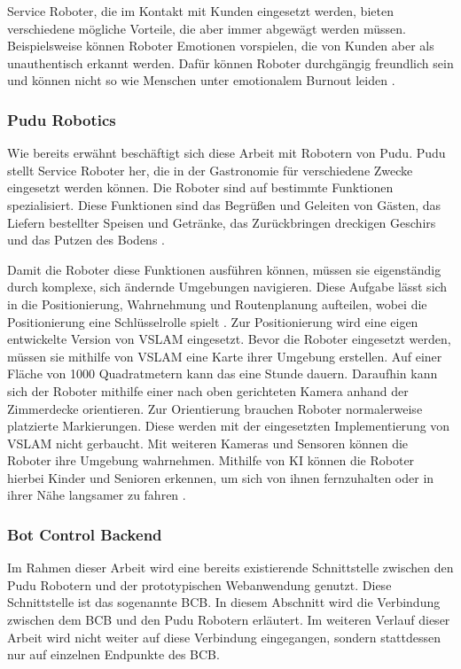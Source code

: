 Service Roboter, die im Kontakt mit Kunden eingesetzt werden, bieten verschiedene mögliche Vorteile, die aber immer abgewägt werden müssen. Beispielsweise können Roboter Emotionen vorspielen, die von Kunden aber als unauthentisch erkannt werden. Dafür können Roboter durchgängig freundlich sein und können nicht so wie Menschen unter emotionalem Burnout leiden \cite[S.~427]{Paluch2020}. 

\subsubsection{Pudu Robotics}

Wie bereits erwähnt beschäftigt sich diese Arbeit mit Robotern von Pudu. Pudu stellt Service Roboter her, die in der Gastronomie für verschiedene Zwecke eingesetzt werden können. Die Roboter sind auf bestimmte Funktionen spezialisiert. Diese Funktionen sind das Begrüßen und Geleiten von Gästen, das Liefern bestellter Speisen und Getränke, das Zurückbringen dreckigen Geschirs und das Putzen des Bodens \cite{PUDU2024}.

Damit die Roboter diese Funktionen ausführen können, müssen sie eigenständig durch komplexe, sich ändernde Umgebungen navigieren. Diese Aufgabe lässt sich in die Positionierung, Wahrnehmung und Routenplanung aufteilen, wobei die Positionierung eine Schlüsselrolle spielt \cite{Nature2022}. Zur Positionierung wird eine eigen entwickelte Version von \ac{VSLAM} eingesetzt. Bevor die Roboter eingesetzt werden, müssen sie mithilfe von \ac{VSLAM} eine Karte ihrer Umgebung erstellen. Auf einer Fläche von 1000 Quadratmetern kann das eine Stunde dauern. Daraufhin kann sich der Roboter mithilfe einer nach oben gerichteten Kamera anhand der Zimmerdecke orientieren. Zur Orientierung brauchen Roboter normalerweise platzierte Markierungen. Diese werden mit der eingesetzten Implementierung von \ac{VSLAM} nicht gerbaucht.\cite{Pudu2023} Mit weiteren Kameras und Sensoren können die Roboter ihre Umgebung wahrnehmen. Mithilfe von KI können die Roboter hierbei Kinder und Senioren erkennen, um sich von ihnen fernzuhalten oder in ihrer Nähe langsamer zu fahren \cite{Nature2022}.

\subsubsection{Bot Control Backend}\label{sec:BotControlBackend}
Im Rahmen dieser Arbeit wird eine bereits existierende Schnittstelle zwischen den Pudu Robotern und der prototypischen Webanwendung genutzt. Diese Schnittstelle ist das sogenannte \ac{BCB}. In diesem Abschnitt wird die Verbindung zwischen dem \ac{BCB} und den Pudu Robotern erläutert. Im weiteren Verlauf dieser Arbeit wird nicht weiter auf diese Verbindung eingegangen, sondern stattdessen nur auf einzelnen Endpunkte des \ac{BCB}.

